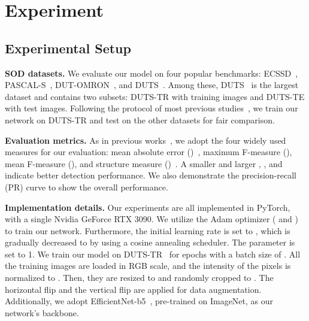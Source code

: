 \documentclass{article}
\begin{document}
\section{Experiment}
\label{sec:experiment}
\vspace{-0.1cm}
\subsection{Experimental Setup}
\vspace{-0.1cm}
{\noindent \bf SOD datasets.}
We evaluate our model on four popular benchmarks: ECSSD~\cite{yan2013hierarchical}, PASCAL-S~\cite{li2014secrets}, DUT-OMRON~\cite{yang2013saliency}, and DUTS~\cite{wang2017learning}. Among these, DUTS~\cite{wang2017learning} is the largest dataset and contains two subsets: DUTS-TR with  training images and DUTS-TE with  test images. Following the protocol of most previous studies~\cite{liu2019employing, zhao2019egnet, wei2020label, pang2020multi, zhou2020interactive}, we train our network on DUTS-TR and test on the other datasets for fair comparison.

{\noindent \bf Evaluation metrics.}
As in previous works~\cite{hou2017deeply, wang2019salient, liu2019employing, zhao2019egnet, wei2020label, zhou2020interactive, pang2020multi}, we adopt the four widely used measures for our evaluation: mean absolute error ()~\cite{borji2015salient}, maximum F-measure (), mean F-measure (), and structure measure ()~\cite{fan2017structure}. A smaller  and larger , , and  indicate better detection performance. We also demonstrate the precision-recall (PR) curve to show the overall performance.

{\noindent \bf Implementation details.}
Our experiments are all implemented in PyTorch, with a single Nvidia GeForce RTX 3090. We utilize the Adam optimizer ( and ) to train our network. Furthermore, the initial learning rate is set to , which is gradually decreased to  by using a cosine annealing scheduler. The parameter  is set to 1. We train our model on DUTS-TR~\cite{wang2017learning} for  epochs with a batch size of . All the training images are loaded in RGB scale, and the intensity of the pixels is normalized to . Then, they are resized to  and randomly cropped to . The horizontal flip and the vertical flip are applied for data augmentation. Additionally, we adopt EfficientNet-b5~\cite{tan2019efficientnet}, pre-trained on ImageNet, as our network's backbone. 

\vspace{-0.2cm}
\end{document}
